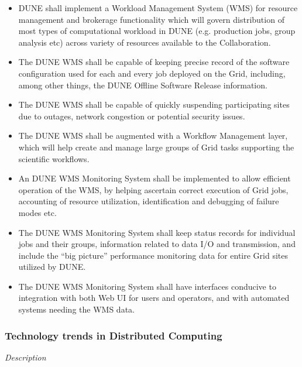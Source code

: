 \begin{itemize}
	\item DUNE  shall implement a Workload Management System (WMS) for resource management and brokerage functionality 
	which will govern  distribution of most types of computational workload in DUNE (e.g. production jobs, group analysis etc) 
	across variety of resources available to the Collaboration.
	
	\item The DUNE WMS shall be capable of keeping precise record of the software configuration used for each and every
	job deployed on the Grid, including, among other things, the DUNE Offline Software Release information.
	
	\item The DUNE WMS shall be capable of quickly suspending participating sites due to outages, network congestion or potential security issues.
	
	\item The DUNE WMS shall be augmented with a Workflow Management layer, which will help create and manage large groups of Grid tasks supporting the scientific workflows.
	
	\item An DUNE WMS Monitoring System shall be implemented to allow efficient operation of the WMS, by helping ascertain
	correct execution of Grid jobs, accounting of resource utilization, identification and debugging of failure modes etc.
	
	\item The DUNE WMS Monitoring System shall keep status records for individual jobs and their groups, information
	related to data I/O and transmission, and include the ``big picture'' performance monitoring data for entire Grid sites utilized by DUNE.
	
	\item The DUNE WMS Monitoring System shall have interfaces conducive to integration with both Web UI for users and operators,
	and with automated systems needing the WMS data.

\end{itemize}

\subsubsection{Technology trends in Distributed Computing}
\textit{Description}

